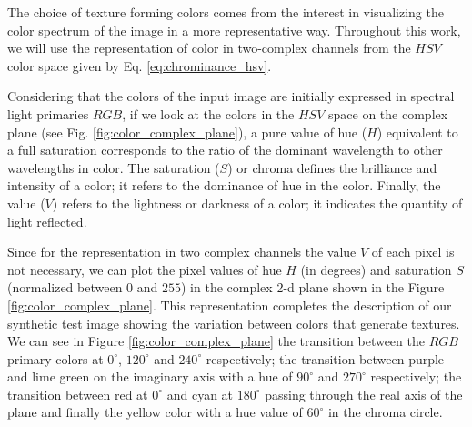 
The choice of texture forming colors comes from the interest in visualizing the color spectrum of the image in a more representative way. Throughout this work, we will use the representation of color in two-complex channels from the $HSV$ color space given by Eq. \eqref{eq:chrominance_hsv}.

Considering that the colors of the input image are initially expressed in spectral light primaries $RGB$, if we look at the colors in the $HSV$ space on the complex plane (see Fig. \ref{fig:color_complex_plane}), a pure value of hue ($H$) equivalent to a full saturation corresponds to the ratio of the dominant wavelength to other wavelengths in color. The saturation ($S$) or chroma defines the brilliance and intensity of a color; it refers to the dominance of hue in the color. Finally, the value ($V$) refers to the lightness or darkness of a color; it indicates the quantity of light reflected.


Since for the representation in two complex channels the value $V$ of each pixel is not necessary, we can plot the pixel values of hue $H$ (in degrees) and saturation $S$ (normalized between $0$ and $255$) in the complex 2-d plane shown in the Figure \ref{fig:color_complex_plane}. This representation completes the description of our synthetic test image showing the variation between colors that generate textures. We can see in Figure \ref{fig:color_complex_plane} the transition between the $RGB$ primary colors at $0^\circ$, $120^\circ$ and $240^\circ$ respectively; the transition between purple and lime green on the imaginary axis with a hue of $90^\circ$ and $270^\circ$ respectively; the transition between red at $0^\circ$ and cyan at $180^\circ$ passing through the real axis of the plane and finally the yellow color with a hue value of $60^\circ$ in the chroma circle.

